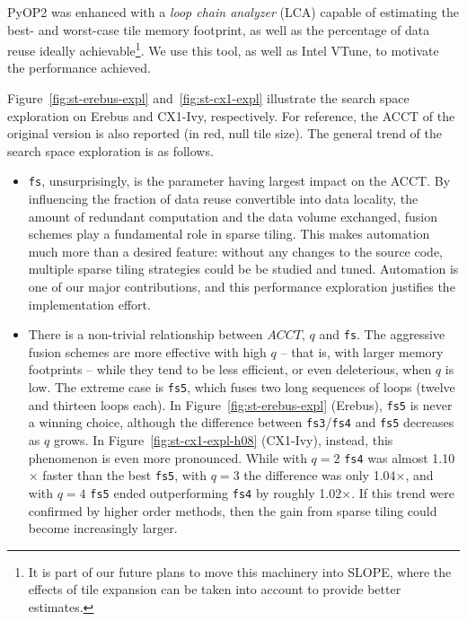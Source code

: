 PyOP2 was enhanced with a \textit{loop chain analyzer} (LCA) capable of estimating the best- and worst-case tile memory footprint, as well as the percentage of data reuse ideally achievable\footnote{It is part of our future plans to move this machinery into SLOPE, where the effects of tile expansion can be taken into account to provide better estimates.}. We use this tool, as well as Intel VTune, to motivate the performance achieved.

Figure~\ref{fig:st-erebus-expl} and~\ref{fig:st-cx1-expl} illustrate the search space exploration on Erebus and CX1-Ivy, respectively. For reference, the ACCT of the original version is also reported (in red, null tile size). The general trend of the search space exploration is as follows.
\begin{itemize}
\item {\tt fs}, unsurprisingly, is the parameter having largest impact on the ACCT. By influencing the fraction of data reuse convertible into data locality, the amount of redundant computation and the data volume exchanged, fusion schemes play a fundamental role in sparse tiling. This makes automation much more than a desired feature: without any changes to the source code, multiple sparse tiling strategies could be be studied and tuned. Automation is one of our major contributions, and this performance exploration justifies the implementation effort. 
\item There is a non-trivial relationship between $ACCT$, $q$ and {\tt fs}. The aggressive fusion schemes are more effective with high $q$ -- that is, with larger memory footprints -- while they tend to be less efficient, or even deleterious, when $q$ is low. The extreme case is {\tt fs5}, which fuses two long sequences of loops (twelve and thirteen loops each). In Figure~\ref{fig:st-erebus-expl} (Erebus), {\tt fs5} is never a winning choice, although the difference between {\tt fs3}/{\tt fs4} and {\tt fs5} decreases as $q$ grows. In Figure~\ref{fig:st-cx1-expl-h08} (CX1-Ivy), instead, this phenomenon is even more pronounced. While with $q=2$ {\tt fs4} was almost 1.10$\times$ faster than the best {\tt fs5}, with $q=3$ the difference was only 1.04$\times$, and with $q=4$ {\tt fs5} ended outperforming {\tt fs4} by roughly 1.02$\times$. If this trend were confirmed by higher order methods, then the gain from sparse tiling could become increasingly larger.

\end{itemize}
